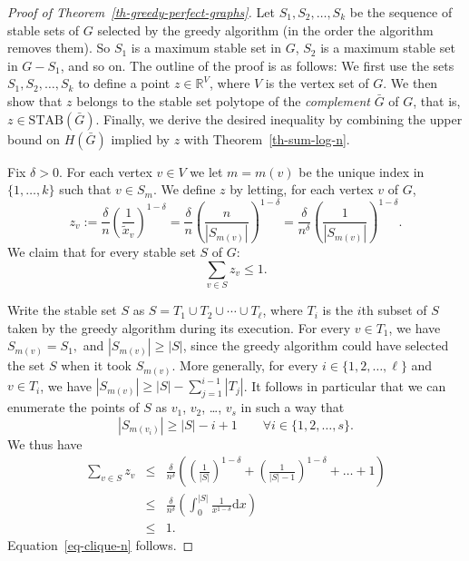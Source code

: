 \documentclass[12pt,oneside]{article}
\newcommand{\STAB}{\mathrm{STAB}}
\begin{document}
\begin{proof}[Proof of Theorem~\ref{th-greedy-perfect-graphs}]
Let $S_{1}, S_{2}, \dots, S_{k}$ be the sequence of stable sets of $G$ selected by the greedy
algorithm (in the order the algorithm removes them).
So $S_1$ is a maximum stable set in $G$, $S_2$ is a maximum stable set in $G - S_1$, and so on.
The outline of the proof is as follows: We first use the sets
$S_{1}, S_{2}, \dots, S_{k}$  to define a point $z \in \mathbb{R}^{V}$, where $V$ is the vertex set of $G$. We then
show that  $z$ belongs to the stable set polytope of the {\em complement} $\bar G$ of $G$, that
is, $z \in \STAB(\bar G)$. Finally, we derive the desired inequality by combining the
upper bound on $H(\bar G)$ implied by $z$ with Theorem~\ref{th-sum-log-n}.

Fix $\delta>0$. For each vertex $v \in V$ we let $m = m(v)$ be the unique index in $\{1,\ldots,k\}$
such that $v \in S_m$. We define $z$ by letting, for each vertex $v$ of $G$,
$$
z_{v} := \frac{\delta}{n} \left(\frac{1}{\tilde{x}_v}\right)^{1-\delta}
= \frac{\delta}{n} \left(\frac{n}{|S_{m(v)}|}\right)^{1-\delta}
= \frac{\delta}{n^\delta} \left(\frac{1}{|S_{m(v)}|}\right)^{1-\delta}.
$$
We claim that for every stable set $S$ of $G$:
\begin{equation}
\label{eq-clique-n}
\sum_{v \in S} z_{v} \leq 1.
\end{equation}

Write the stable set $S$ as $S = T_{1} \cup T_{2} \cup \cdots \cup T_{\ell}$, where $T_{i}$ is the $i$th subset of $S$ taken by the greedy algorithm during its execution.
For every $v \in T_{1}$, we have  $S_{m(v)}=S_1,$ and $|S_{m(v)}| \geq |S|$, since the greedy algorithm could have
selected the set $S$ when it took $S_{m(v)}$.
More generally, for every $i \in \{1,2, \dots, \ell\}$ and $v \in T_{i}$, we have
$|S_{m(v)}| \geq |S| - \sum_{j=1}^{i-1}|T_{j}|$. It follows in particular that we can enumerate the points of $S$ as $v_1$, $v_2$, \ldots, $v_s$ in such a way that
$$
|S_{m(v_{i})}| \geq |S| - i +1 \qquad \forall i \in \{1,2,\ldots,s\}.
$$
We thus have
\begin{eqnarray*}
\sum_{v \in S} z_{v}
&\le &
\frac{\delta}{n^\delta} \left(\left(\frac{1}{|S|}\right)^{1-\delta} + \left(\frac{1}{|S|-1}\right)^{1-\delta} + \ldots + 1\right)\\
&\le &
\frac{\delta}{n^\delta} \left(\int_0^{|S|} \frac{1}{x^{1-\delta}} \mathrm{d}x\right)\\
&\le & 1.
\end{eqnarray*}
Equation~\eqref{eq-clique-n} follows.


\end{proof}
\end{document}

